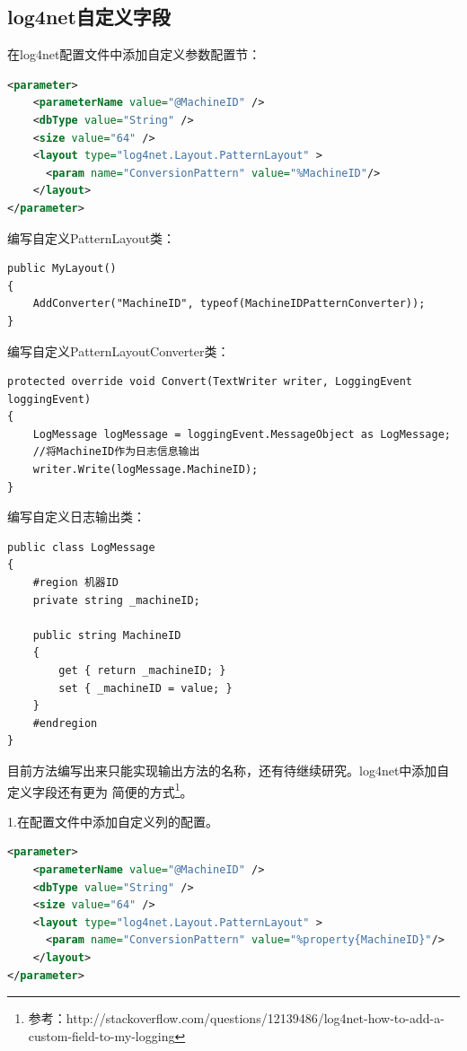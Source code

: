 \documentclass{book}
\begin{document}
\subsection{log4net自定义字段}

在log4net配置文件中添加自定义参数配置节：
\begin{lstlisting}[language=XML]
<parameter>
	<parameterName value="@MachineID" />
	<dbType value="String" />
	<size value="64" />
	<layout type="log4net.Layout.PatternLayout" >
	  <param name="ConversionPattern" value="%MachineID"/>
	</layout>
</parameter>
\end{lstlisting}

编写自定义PatternLayout类：
\begin{lstlisting}[language={[Sharp]C}]
public MyLayout()
{
    AddConverter("MachineID", typeof(MachineIDPatternConverter));
} 
\end{lstlisting}

编写自定义PatternLayoutConverter类：

\begin{lstlisting}[language={[Sharp]C}]
 protected override void Convert(TextWriter writer, LoggingEvent loggingEvent)
{
    LogMessage logMessage = loggingEvent.MessageObject as LogMessage;
    //将MachineID作为日志信息输出
    writer.Write(logMessage.MachineID);
}
\end{lstlisting}

编写自定义日志输出类：

\begin{lstlisting}[language={[Sharp]C}]
public class LogMessage
{
    #region 机器ID
    private string _machineID;

    public string MachineID
    {
        get { return _machineID; }
        set { _machineID = value; }
    }
    #endregion
}
\end{lstlisting}

目前方法编写出来只能实现输出方法的名称，还有待继续研究。log4net中添加自定义字段还有更为
简便的方式\footnote{参考：http://stackoverflow.com/questions/12139486/log4net-how-to-add-a-custom-field-to-my-logging}。

1.在配置文件中添加自定义列的配置。

\begin{lstlisting}[language=XML]
<parameter>
	<parameterName value="@MachineID" />
	<dbType value="String" />
	<size value="64" />
	<layout type="log4net.Layout.PatternLayout" >
	  <param name="ConversionPattern" value="%property{MachineID}"/>
	</layout>
</parameter>
\end{lstlisting}
\end{document}
